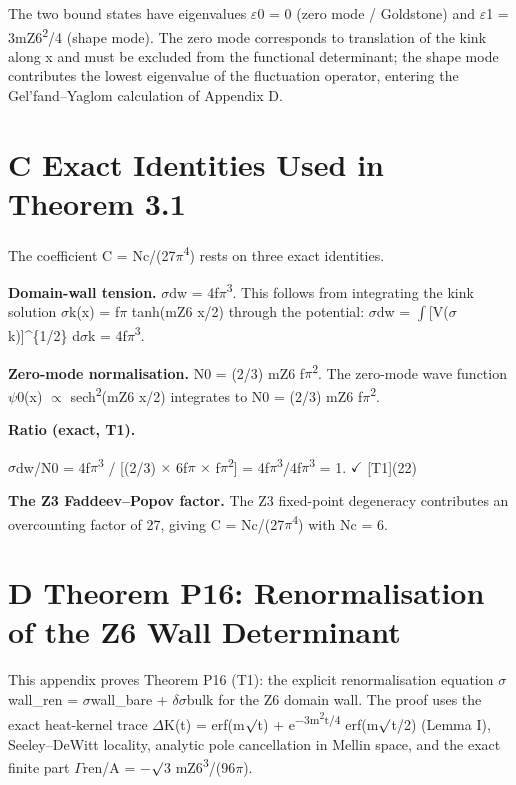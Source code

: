 \documentclass[11pt,letterpaper]{article}
\begin{document}
\noindent The two bound states have eigenvalues $\varepsilon$0 = 0 (zero mode / Goldstone) and $\varepsilon$1 = 3mZ6\textsuperscript{2}/4 (shape mode). The zero mode corresponds to translation of the kink along x and must be excluded from the functional determinant; the shape mode contributes the lowest eigenvalue of the fluctuation operator, entering the Gel'fand--Yaglom calculation of Appendix D.

\section*{C  Exact Identities Used in Theorem 3.1}

\noindent The coefficient C = Nc/(27$\pi$\textsuperscript{4}) rests on three exact identities.

\noindent \textbf{Domain-wall tension. }$\sigma$dw = 4f$\pi$\textsuperscript{3}. This follows from integrating the kink solution $\sigma$k(x) = f$\pi$ tanh(mZ6 x/2) through the potential: $\sigma$dw = $\int$[V($\sigma$k)]\textasciicircum{}\{1/2\} d$\sigma$k = 4f$\pi$\textsuperscript{3}.

\noindent \textbf{Zero-mode normalisation. }N0 = (2/3) mZ6 f$\pi$\textsuperscript{2}. The zero-mode wave function $\psi$0(x) $\propto$ sech\textsuperscript{2}(mZ6 x/2) integrates to N0 = (2/3) mZ6 f$\pi$\textsuperscript{2}.

\noindent \textbf{Ratio (exact, T1).}

\begingroup\centering $\sigma$dw/N0 = 4f$\pi$\textsuperscript{3} / [(2/3) $\times$ 6f$\pi$ $\times$ f$\pi$\textsuperscript{2}] = 4f$\pi$\textsuperscript{3}/4f$\pi$\textsuperscript{3} = 1. $\checkmark$ [T1]\hspace{2em}(22)\par\endgroup

\noindent \textbf{The Z3 Faddeev--Popov factor. }The Z3 fixed-point degeneracy contributes an overcounting factor of 27, giving C = Nc/(27$\pi$\textsuperscript{4}) with Nc = 6.

\section*{D  Theorem P16: Renormalisation of the Z6 Wall Determinant}

\noindent This appendix proves Theorem P16 (T1): the explicit renormalisation equation $\sigma$wall\_ren = $\sigma$wall\_bare + $\delta$$\sigma$bulk for the Z6 domain wall. The proof uses the exact heat-kernel trace $\Delta$K(t) = erf(m$\surd$t) + e\textsuperscript{$-$3m\textsuperscript{2}t/4} erf(m$\surd$t/2) (Lemma I), Seeley--DeWitt locality, analytic pole cancellation in Mellin space, and the exact finite part $\Gamma$ren/A = $-$$\surd$3 mZ6\textsuperscript{3}/(96$\pi$).
\end{document}
